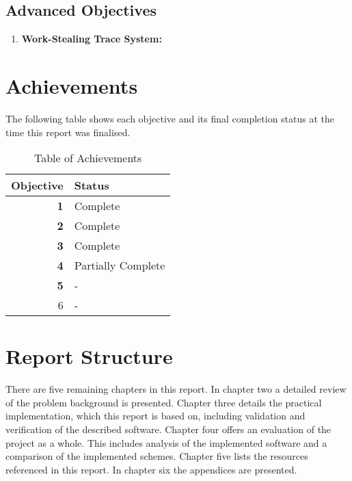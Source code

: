 \subsection*{Advanced Objectives}
\begin{enumerate}
\setcounter{enumi}{\value{saveenum}}
\item \textbf{Work-Stealing Trace System:}
\end{enumerate}

\section*{Achievements}
The following table shows each objective and its final completion status at the time this 
report was finalised. 

\begin{table}[H]
    \centering
    \begin{tabular}{|r|l|}
        \hline
            \textbf{Objective} & \textbf{Status} \\
        \hline \hline
            \textbf{1} & Complete \\
            \textbf{2} & Complete \\
            \textbf{3} & Complete \\
            \textbf{4} & Partially Complete \\
            \textbf{5} & - \\
        \hline
            6 & - \\
        \hline
    \end{tabular}
    
    \label{tab:ach}
    \caption{Table of Achievements}
\end{table}

\section*{Report Structure}

There are five remaining chapters in this report. 
In chapter two a detailed review of the problem background is presented. 
Chapter three details the practical implementation, which this report is based on, including validation and verification of the described software.
Chapter four offers an evaluation of the project as a whole. This includes analysis of the implemented software and a comparison of the implemented
schemes.
Chapter five lists the resources referenced in this report.
In chapter six the appendices are presented.

